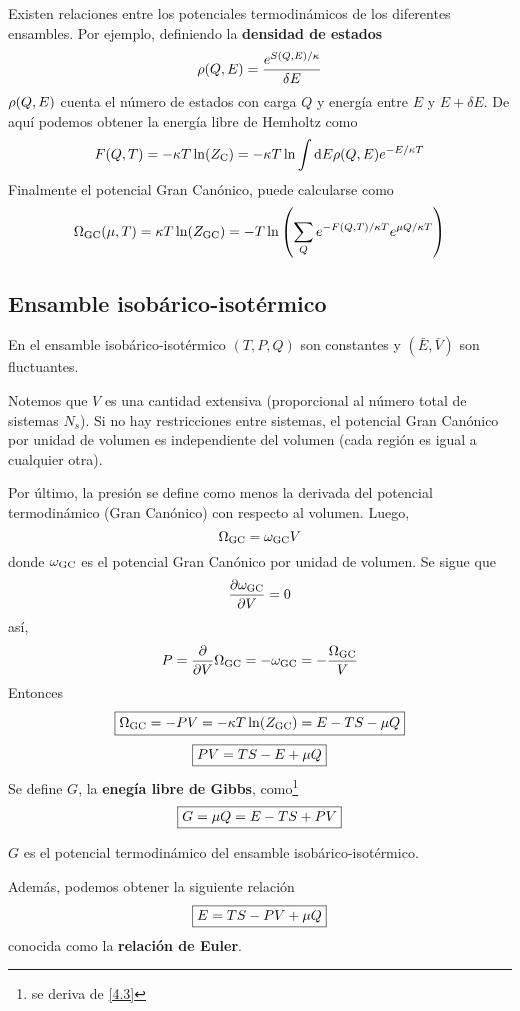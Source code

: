 Existen relaciones entre los potenciales termodinámicos de los diferentes ensambles. Por ejemplo, definiendo la \textbf{densidad de estados}
\begin{equation}
  \rho(Q,E)=\frac{e^{S(Q,E)/\kappa}}{\delta E}	
\end{equation}
$\rho(Q,E)$ cuenta el número de estados con carga $Q$ y energía entre $E$ y $E+\delta E$. De aquí podemos obtener la energía libre de Hemholtz como
\begin{equation}
  F(Q,T)=-\kappa T\ln(Z_{\rm C})=-\kappa T\ln\int\dd E\rho(Q,E)e^{-E/\kappa T}
\end{equation}
Finalmente el potencial Gran Canónico, puede calcularse como
\begin{equation}
  \Omega_{\rm GC}(\mu,T)=\kappa T\ln(Z_{\rm GC})=-T\ln\left(\sum_Qe^{-F(Q,T)/\kappa T}e^{\mu Q/\kappa T}\right)
\end{equation}

\subsection{Ensamble isobárico-isotérmico}
En el ensamble isobárico-isotérmico $(T,P,Q)$ son constantes y $(\bar{E},\bar{V})$ son fluctuantes.

Notemos que $V$ es una cantidad extensiva (proporcional al número total de sistemas $N_s$). Si no hay restricciones entre sistemas, el potencial Gran Canónico por unidad de volumen es independiente del volumen (cada región es igual a cualquier otra).

Por último, la presión se define como menos la derivada del potencial termodinámico (Gran Canónico) con respecto al volumen. Luego,
\begin{equation}
  \Omega_{\rm GC}=\omega_{\rm GC}V
\end{equation}
donde $\omega_{\rm GC}$ es el potencial Gran Canónico por unidad de volumen. Se sigue que
\begin{equation}
  \pdv{\omega_{\rm GC}}{V}=0
\end{equation}
así,
\begin{equation}
  P=\pdv{V}\Omega_{\rm GC}=-\omega_{\rm GC}=-\frac{\Omega_{\rm GC}}{V}
\end{equation}
Entonces
\begin{equation}
\boxed{  \Omega_{\rm GC}=-PV=-\kappa T\ln(Z_{\rm GC})=E-TS-\mu Q}
\end{equation}
\begin{equation}\label{4.3}
\boxed{  PV=TS-E+\mu Q}
\end{equation}
Se define $G$, la \textbf{enegía libre de Gibbs}, como\footnote{se deriva de \eqref{4.3}}
\begin{equation}
\boxed{  G=\mu Q=E-TS+PV}
\end{equation}

$G$ es el potencial termodinámico del ensamble isobárico-isotérmico.

Además, podemos obtener la siguiente relación
\begin{equation}
\boxed{  E=TS-PV+\mu Q}
\end{equation}
conocida como la \textbf{relación de Euler}.





















